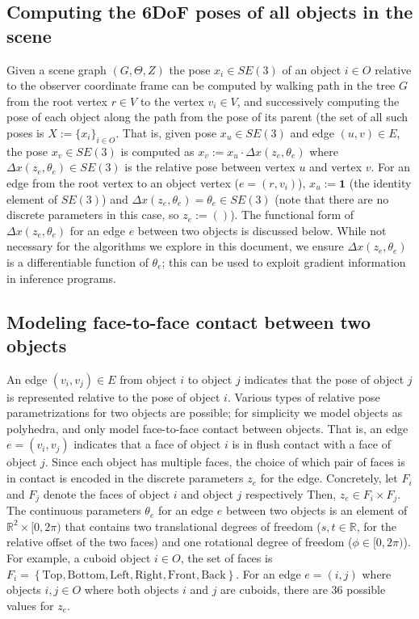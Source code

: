 \subsection{Computing the 6DoF poses of all objects in the scene} \label{6dofCalculation}
Given a scene graph $(G, \Theta, Z)$ the pose $x_i \in SE(3)$ of an object $i \in O$ relative to the observer coordinate frame can be computed by walking path in the tree $G$ from the root vertex $r \in V$ to the vertex $v_i \in V$, and successively computing the pose of each object along the path from the pose of its parent (the set of all such poses is $X := \{x_i\}_{i \in O}$.
That is, given pose $x_u \in SE(3)$ and edge $(u, v) \in E$, the pose $x_v \in SE(3)$ is computed as $x_v := x_u \cdot \Delta x(z_e, \theta_e)$ where $\Delta x(z_e, \theta_e) \in SE(3)$ is the relative pose between vertex $u$ and vertex $v$.
For an edge from the root vertex to an object vertex ($e = (r, v_i)$), $x_u := \mathbf{1}$ (the identity element of $SE(3)$) and $\Delta x(z_e, \theta_e) = \theta_e \in SE(3)$ (note that there are no discrete parameters in this case, so $z_e := ()$).
The functional form of $\Delta x(z_e, \theta_e)$ for an edge $e$ between two objects is discussed below.
While not necessary for the algorithms we explore in this document, we ensure $\Delta x(z_e, \theta_e)$ is a differentiable function of $\theta_e$; this can be used to exploit gradient information in inference programs.

\subsection{Modeling face-to-face contact between two objects}
An edge $(v_i, v_j) \in E$ from object $i$ to object $j$ indicates that the pose of object $j$ is represented relative to the pose of object $i$.
Various types of relative pose parametrizations for two objects are possible; for simplicity we model objects as polyhedra, and only model face-to-face contact between objects.
That is, an edge $e = (v_i, v_j)$ indicates that a face of object $i$ is in flush contact with a face of object $j$.
Since each object has multiple faces, the choice of which pair of faces is in contact is encoded in the discrete parameters $z_e$ for the edge.
Concretely, let $F_i$ and $F_j$ denote the faces of object $i$ and object $j$ respectively
Then, $z_e \in F_i \times F_j$.
The continuous parameters $\theta_e$ for an edge $e$ between two objects is an element of $\mathbb{R}^2 \times [0, 2 \pi)$ that contains two translational degrees of freedom ($s, t \in \mathbb{R}$, for the relative offset of the two faces) and one rotational degree of freedom ($\phi \in [0, 2 \pi)$).
For example, a cuboid object $i \in O$, the set of faces is $F_i = \left\{\mathrm{Top, Bottom, Left, Right, Front, Back}\right\}$.
For an edge $e = (i, j)$ where objects $i, j \in O$ where both objects $i$ and $j$ are cuboids, there are 36 possible values for $z_e$.

